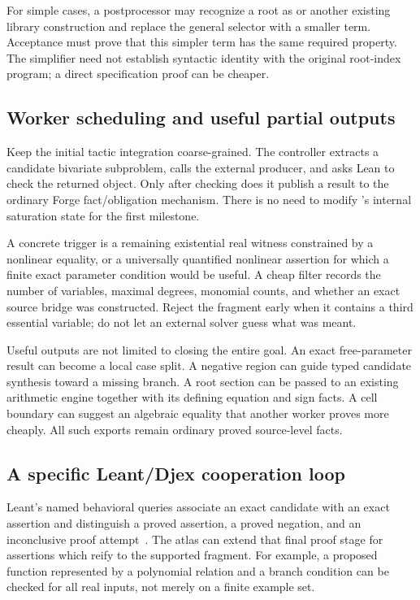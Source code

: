 For simple cases, a postprocessor may recognize a root as  or another existing library construction and replace the general selector with a smaller term. Acceptance must prove that this simpler term has the same required property. The simplifier need not establish syntactic identity with the original root-index program; a direct specification proof can be cheaper.

\subsection{Worker scheduling and useful partial outputs}
Keep the initial tactic integration coarse-grained. The controller extracts a candidate bivariate subproblem, calls the external producer, and asks Lean to check the returned object. Only after checking does it publish a result to the ordinary Forge fact/obligation mechanism. There is no need to modify 's internal saturation state for the first milestone.

A concrete trigger is a remaining existential real witness constrained by a nonlinear equality, or a universally quantified nonlinear assertion for which a finite exact parameter condition would be useful. A cheap filter records the number of variables, maximal degrees, monomial counts, and whether an exact source bridge was constructed. Reject the fragment early when it contains a third essential variable; do not let an external solver guess what was meant.

Useful outputs are not limited to closing the entire goal. An exact free-parameter result can become a local case split. A negative region can guide typed candidate synthesis toward a missing branch. A root section can be passed to an existing arithmetic engine together with its defining equation and sign facts. A cell boundary can suggest an algebraic equality that another worker proves more cheaply. All such exports remain ordinary proved source-level facts.

\subsection{A specific Leant/Djex cooperation loop}
Leant's named behavioral queries associate an exact candidate with an exact assertion and distinguish a proved assertion, a proved negation, and an inconclusive proof attempt~\cite{leant-behavior}. The atlas can extend that final proof stage for assertions which reify to the supported fragment. For example, a proposed function represented by a polynomial relation and a branch condition can be checked for all real inputs, not merely on a finite example set.

